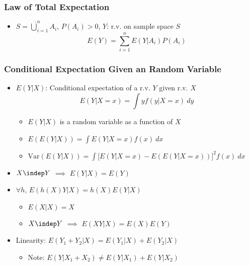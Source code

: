 \subsubsection*{Law of Total Expectation}
\begin{itemize}
    \item $S=\dot{\bigcup}_{i=1}^nA_i$, $P(A_i)>0$, $Y$: r.v. on sample space $S$
    \begin{equation}
        E(Y)=\sum_{i=1}^nE(Y|A_i)P(A_i)
    \end{equation}
\end{itemize}

\subsubsection*{Conditional Expectation Given an Random Variable}
\begin{itemize}
    \item $E(Y|X)$: Conditional expectation of a r.v. $Y$ given r.v. $X$
    \begin{equation}
        E(Y|X=x)=\int yf(y|X=x)~dy
    \end{equation}
    \begin{itemize}
        \item $E(Y|X)$ is a random variable as a function of $X$
        \item $E(E(Y|X))=\int E(Y|X=x)f(x)~dx$
        \item $\text{Var}(E(Y|X))=\int \Bigr[E(Y|X=x)-E(E(Y|X=x))\Bigr]^2f(x)~dx$
    \end{itemize}
    \item $X\indep Y$ $\implies$ $E(Y|X)=E(Y)$
    \item $\forall h$, $E(h(X)Y|X)=h(X)E(Y|X)$
    \begin{itemize}
        \item $E(X|X)=X$
        \item $X\indep Y$ $\implies$ $E(XY|X)=E(X)E(Y)$
    \end{itemize}
    \item Linearity: $E(Y_1+Y_2|X)=E(Y_1|X)+E(Y_2|X)$
    \begin{itemize}
        \item Note: $E(Y|X_1+X_2)\neq E(Y|X_1)+E(Y|X_2)$
    \end{itemize}
\end{itemize}

